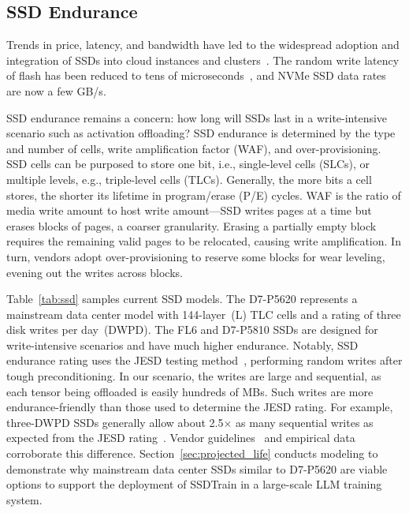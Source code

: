\subsection{SSD Endurance}

Trends in price, latency, and bandwidth have led to the widespread adoption and integration of SSDs into cloud instances and clusters~\cite{microsoftNDA100V4series2024,googleGPUMachineTypes,ncsaDeltaProjectProfile}.
The random write latency of flash has been reduced to tens of microseconds~\cite{samsungUltraLowLatencySamsung2017}, and NVMe SSD data rates are now a few GB/s.


SSD endurance remains a concern: how long will SSDs last in a write-intensive scenario such as activation offloading?
SSD endurance is determined by the type and number of cells, write amplification factor (WAF), and over-provisioning.
SSD cells can be purposed to store one bit, i.e., single-level cells (SLCs), or multiple levels, e.g., triple-level cells (TLCs).
Generally, the more bits a cell stores, the shorter its lifetime in program/erase (P/E) cycles. WAF is the ratio of media write amount to host write amount---SSD writes pages at a time but erases blocks of pages, a coarser granularity. Erasing a partially empty block requires the remaining valid pages to be relocated, causing write amplification. 
In turn, vendors adopt over-provisioning to reserve some blocks for wear leveling, evening out the writes across blocks. 


Table~\ref{tab:ssd} samples current SSD models. The \mbox{D7-P5620} represents a mainstream data center model with 144-layer~(L) TLC cells and a rating of three disk writes per day~(DWPD). The FL6 and \mbox{D7-P5810} SSDs are designed for write-intensive scenarios and have much higher endurance. Notably, SSD endurance rating uses the JESD testing method~\cite{jedecsolidstatetechnologyassociationJESD218BSolidStateDrive2016}, performing random writes after tough preconditioning. In our scenario, the writes are large and sequential, as each tensor being offloaded is easily hundreds of MBs. Such writes are more endurance-friendly than those used to determine the JESD rating. 
For example, \mbox{three-DWPD} SSDs generally allow about 2.5$\times$ as many sequential writes as expected from the JESD rating~\cite{lenovoWhatNeedKnow2023,qnapsystemsinc.QNAPNASSolution2108, smartmodulartechnologiesinc.WhySMARTOverProvisioning2024}. Vendor guidelines~\cite{solidigmSolidigmSSDEndurance,intelOverProvisioningNANDBasedIntel2018,samsungOverProvisioningBenefitsSamsung2019} and empirical data~\cite{maneasOperationalCharacteristicsSSDs2022} corroborate this difference.
Section~\ref{sec:projected_life} conducts modeling to demonstrate why mainstream data center SSDs similar to \mbox{D7-P5620} are viable options to support the deployment of SSDTrain in a large-scale LLM training system.



